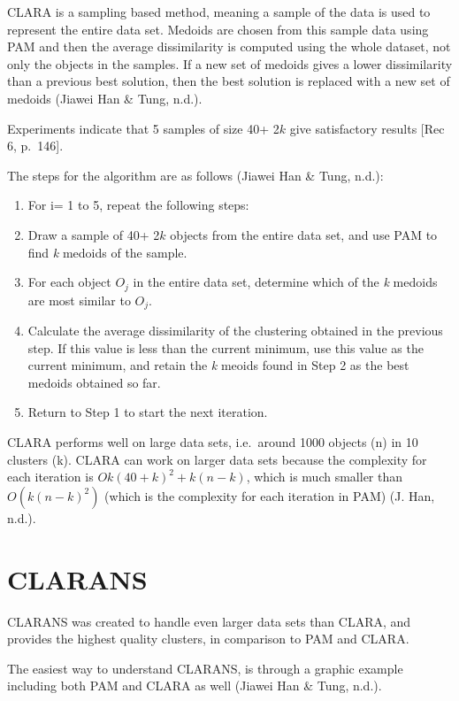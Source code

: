 \documentclass[12pt,twoside]{amherstthesis}
\begin{document}
  CLARA is a sampling based method, meaning a sample of the data is used
  to represent the entire data set. Medoids are chosen from this sample
  data using PAM and then the average dissimilarity is computed using the
  whole dataset, not only the objects in the samples. If a new set of
  medoids gives a lower dissimilarity than a previous best solution, then
  the best solution is replaced with a new set of medoids (Jiawei Han \&
  Tung, n.d.).
  
  Experiments indicate that 5 samples of size 40+ 2\(k\) give satisfactory
  results {[}Rec 6, p.~146{]}.
  
  The steps for the algorithm are as follows (Jiawei Han \& Tung, n.d.):
  
  \begin{enumerate}
  \def\labelenumi{\arabic{enumi}.}
  \item
    For i= 1 to 5, repeat the following steps:
  \item
    Draw a sample of 40+ 2\(k\) objects from the entire data set, and use
    PAM to find \emph{k} medoids of the sample.
  \item
    For each object \(O_j\) in the entire data set, determine which of the
    \emph{k} medoids are most similar to \(O_j\).
  \item
    Calculate the average dissimilarity of the clustering obtained in the
    previous step. If this value is less than the current minimum, use
    this value as the current minimum, and retain the \emph{k} meoids
    found in Step 2 as the best medoids obtained so far.
  \item
    Return to Step 1 to start the next iteration.
  \end{enumerate}
  
  CLARA performs well on large data sets, i.e.~around 1000 objects (n) in
  10 clusters (k). CLARA can work on larger data sets because the
  complexity for each iteration is \(O{k(40 + k)^2 + k(n-k)}\), which is
  much smaller than \(O(k(n-k)^2)\) (which is the complexity for each
  iteration in PAM) (J. Han, n.d.).
  
  \section{CLARANS}\label{clarans}
  
  CLARANS was created to handle even larger data sets than CLARA, and
  provides the highest quality clusters, in comparison to PAM and CLARA.
  
  The easiest way to understand CLARANS, is through a graphic example
  including both PAM and CLARA as well (Jiawei Han \& Tung, n.d.).
  
\end{document}
